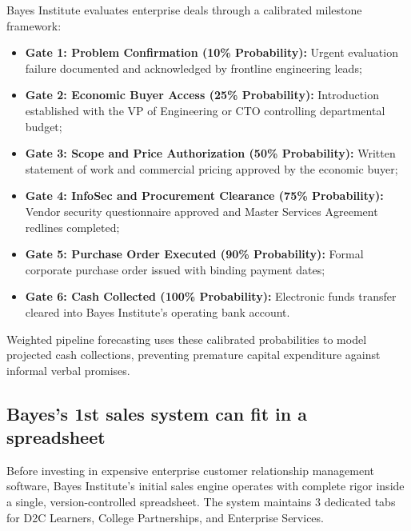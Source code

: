 Bayes Institute evaluates enterprise deals through a calibrated milestone framework:
\begin{itemize}
\item \textbf{Gate 1: Problem Confirmation (10\% Probability):} Urgent evaluation failure documented and acknowledged by frontline engineering leads;
\item \textbf{Gate 2: Economic Buyer Access (25\% Probability):} Introduction established with the VP of Engineering or CTO controlling departmental budget;
\item \textbf{Gate 3: Scope and Price Authorization (50\% Probability):} Written statement of work and commercial pricing approved by the economic buyer;
\item \textbf{Gate 4: InfoSec and Procurement Clearance (75\% Probability):} Vendor security questionnaire approved and Master Services Agreement redlines completed;
\item \textbf{Gate 5: Purchase Order Executed (90\% Probability):} Formal corporate purchase order issued with binding payment dates;
\item \textbf{Gate 6: Cash Collected (100\% Probability):} Electronic funds transfer cleared into Bayes Institute's operating bank account.
\end{itemize}
Weighted pipeline forecasting uses these calibrated probabilities to model projected cash collections, preventing premature capital expenditure against informal verbal promises.

\subsection{Bayes's 1st sales system can fit in a spreadsheet}

Before investing in expensive enterprise customer relationship management software, Bayes Institute's initial sales engine operates with complete rigor inside a single, version-controlled spreadsheet. The system maintains 3 dedicated tabs for D2C Learners, College Partnerships, and Enterprise Services.

